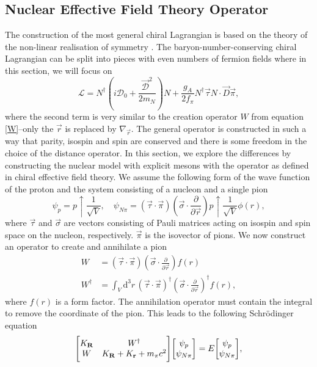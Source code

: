 \subsection{Nuclear Effective Field Theory Operator}
The construction of the most general chiral Lagrangian is based on the theory of the non-linear realisation of symmetry \cite{EFTLagrangian}. The baryon-number-conserving chiral Lagrangian can be split into pieces with even numbers of fermion fields where in this section, we will focus on 
\begin{equation}
	\mathcal{L} = N^\dagger \left(i\mathcal{D}_0+\frac{\vec{\mathcal{D}}^2}{2m_N} \right)N+\frac{g_A}{2f_\pi}N^\dagger\vec{\tau}N\cdot \vec{D}\vec{\pi},
\end{equation}
where the second term is very similar to the creation operator $W$ from equation \eqref{W}--only the $\vec{r}$ is replaced by $\nabla_{\vec{r}}$. The general operator is constructed in such a way that parity, isospin and spin are conserved and there is some freedom in the choice of the distance operator. In this section, we explore the differences by constructing the nuclear model with explicit mesons with the operator as defined in chiral effective field theory. We assume the following form of the wave function of the proton and the system consisting of a nucleon and a single pion
\begin{equation}\label{EFT1}
	\psi_p = p\uparrow\frac{1}{\sqrt{V}}, \quad \psi_{N\pi} = (\vec{\tau}\cdot \vec{\pi})(\vec{\sigma}\cdot \frac{\partial}{\partial\vec{r}})p\uparrow \frac{1}{\sqrt{V}}\phi(r),
\end{equation}
where $\vec{\tau}$ and $\vec{\sigma}$ are vectors consisting of Pauli matrices acting on isospin and spin space on the nucleon, respectively. $\vec{\pi}$ is the isovector of pions. We now construct an operator to create and annihilate a pion
\begin{align}\label{EFT2}
	W & = (\vec{\tau}\cdot \vec{\pi})(\vec{\sigma}\cdot \frac{\partial}{\partial\vec{r}})f(r) \\
	W^\dagger & = \int_V \text{d}^3 r \, (\vec{\tau}\cdot \vec{\pi})^\dagger(\vec{\sigma}\cdot \frac{\partial}{\partial\vec{r}})^\dagger f(r), \label{EFT3}
\end{align}
where $f(r)$ is a form factor. The annihilation operator must contain the integral to remove the coordinate of the pion. This leads to the following Schrödinger equation
\begin{equation}
	\mqty[K_{\vec{R}} & W^\dagger \\ W & K_{\vec{R}}+K_{\vec{r}}+m_\pi c^2]\mqty[\psi_p \\ \psi_{N\pi}]=E\mqty[\psi_p \\ \psi_{N\pi}],
\end{equation}
